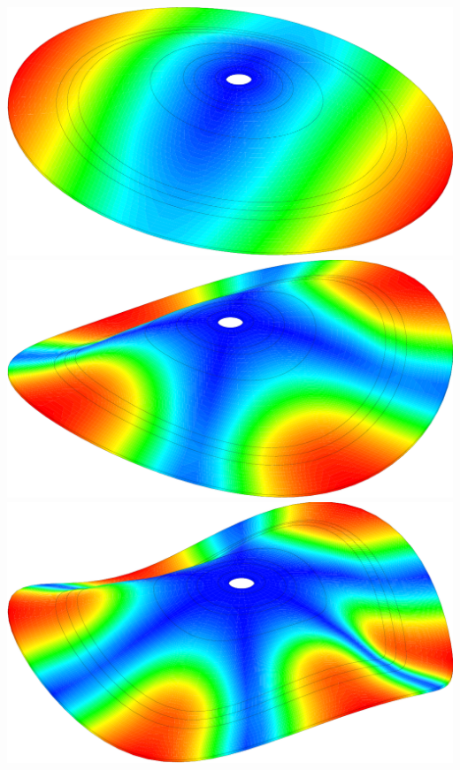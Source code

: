 \begin{frame}{}
\begin{itemize}
{\begin{textblock*}{10cm}
\begin{center}
          \includegraphics[height=0.2\textheight]{images/cymbale_mode_1}
          \includegraphics[height=0.2\textheight]{images/cymbale_mode_2}
          \includegraphics[height=0.2\textheight]{images/cymbale_mode_4}\\
          \tiny{}
        \end{center}
      \end{textblock*}
}
\end{itemize}
\end{frame}
